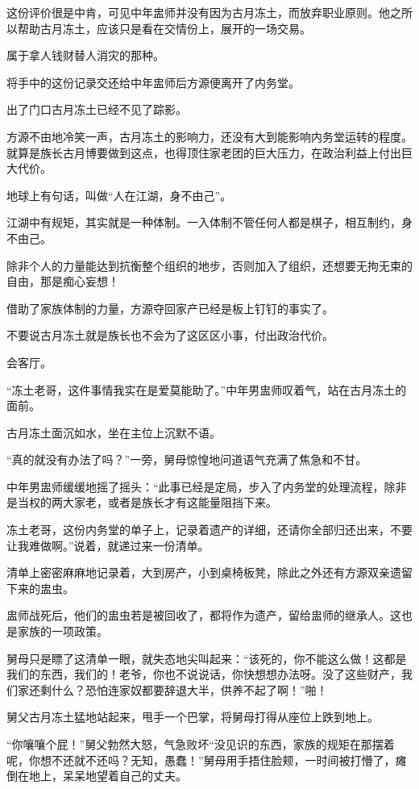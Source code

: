 \begin{this_body}
这份评价很是中肯，可见中年盅师并没有因为古月冻土，而放弃职业原则。他之所以帮助古月冻土，应该只是看在交情份上，展开的一场交易。

属于拿人钱财替人消灾的那种。

将手中的这份记录交还给中年盅师后方源便离开了内务堂。

出了门口古月冻土已经不见了踪影。

方源不由地冷笑一声，古月冻土的影响力，还没有大到能影响内务堂运转的程度。就算是族长古月博要做到这点，也得顶住家老团的巨大压力，在政治利益上付出巨大代价。

地球上有句话，叫做“人在江湖，身不由己”。

江湖中有规矩，其实就是一种体制。一入体制不管任何人都是棋子，相互制约，身不由己。

除非个人的力量能达到抗衡整个组织的地步，否则加入了组织，还想要无拘无束的自由，那是痴心妄想！

借助了家族体制的力量，方源夺回家产已经是板上钉钉的事实了。

不要说古月冻土就是族长也不会为了这区区小事，付出政治代价。

会客厅。

“冻土老哥，这件事情我实在是爱莫能助了。”中年男盅师叹着气，站在古月冻土的面前。

古月冻土面沉如水，坐在主位上沉默不语。

“真的就没有办法了吗？”一旁，舅母惊惶地问道语气充满了焦急和不甘。

中年男盅师缓缓地摇了摇头：“此事已经是定局，步入了内务堂的处理流程，除非是当权的两大家老，或者是族长才有这能量阻挡下来。

冻土老哥，这份内务堂的单子上，记录着遗产的详细，还请你全部归还出来，不要让我难做啊。”说着，就递过来一份清单。

清单上密密麻麻地记录着，大到房产，小到桌椅板凳，除此之外还有方源双亲遗留下来的盅虫。

盅师战死后，他们的盅虫若是被回收了，都将作为遗产，留给盅师的继承人。这也是家族的一项政策。

舅母只是瞟了这清单一眼，就失态地尖叫起来：“该死的，你不能这么做！这都是我们的东西，我们的！老爷，你也不说说话，你快想想办法呀。没了这些财产，我们家还剩什么？恐怕连家奴都要辞退大半，供养不起了啊！”啪！

舅父古月冻土猛地站起来，甩手一个巴掌，将舅母打得从座位上跌到地上。

“你嚷嚷个屁！”舅父勃然大怒，气急败坏“没见识的东西，家族的规矩在那摆着呢，你想不还就不还吗？无知，愚蠢！”舅母用手捂住脸颊，一时间被打懵了，瘫倒在地上，呆呆地望着自己的丈夫。


\end{this_body}
